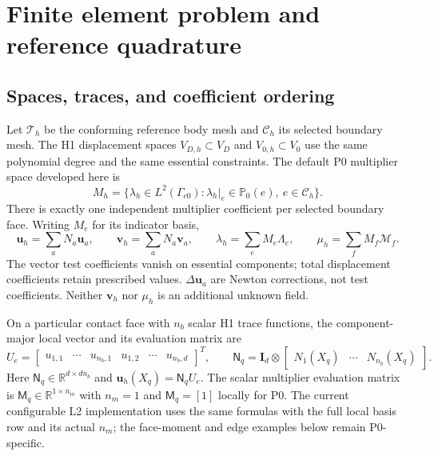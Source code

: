 \documentclass[preprint,11pt]{elsarticle}
\numberwithin{equation}{section}
\newcommand{\bu}{\boldsymbol{u}}
\newcommand{\bv}{\boldsymbol{v}}
\newcommand{\bI}{\boldsymbol{I}}
\newcommand{\Gc}{\Gamma_{c0}}
\begin{document}
\section{Finite element problem and reference quadrature}
\label{sec:discrete}

\subsection{Spaces, traces, and coefficient ordering}
Let $\mathcal{T}_h$ be the conforming reference body mesh and
$\mathcal{C}_h$ its selected boundary mesh. The H1 displacement spaces
$V_{D,h}\subset V_D$ and $V_{0,h}\subset V_0$ use the same polynomial
degree and the same essential constraints. The default P0 multiplier
space developed here is
\begin{equation}
 M_h=\{\lambda_h\in L^2(\Gc):
             \lambda_h|_e\in\mathbb{P}_0(e),\ e\in\mathcal{C}_h\}.
 \label{eq:p0space}
\end{equation}
There is exactly one independent multiplier coefficient per selected
boundary face. Writing $M_e$ for its indicator basis,
\begin{equation}
 \bu_h=\sum_a N_a\boldsymbol{u}_a,\qquad
 \bv_h=\sum_a N_a\boldsymbol{v}_a,\qquad
 \lambda_h=\sum_e M_e\Lambda_e,\qquad
 \mu_h=\sum_f M_f\mathcal{M}_f.
 \label{eq:febases}
\end{equation}
The vector test coefficients vanish on essential components; total
displacement coefficients retain prescribed values. $\Delta\boldsymbol{u}_a$
are Newton corrections, not test coefficients. Neither $\bv_h$ nor
$\mu_h$ is an additional unknown field.

On a particular contact face with $n_b$ scalar H1 trace functions, the
component-major local vector and its evaluation matrix are
\begin{equation}
 U_e=\begin{bmatrix}
 u_{1,1}&\cdots&u_{n_b,1}&u_{1,2}&\cdots&u_{n_b,d}
 \end{bmatrix}^{T},\qquad
 \mathsf N_q=\bI_d\otimes
      \begin{bmatrix}N_1(X_q)&\cdots&N_{n_b}(X_q)\end{bmatrix}.
 \label{eq:evalmatrix}
\end{equation}
Here $\mathsf N_q\in\mathbb{R}^{d\times dn_b}$ and
$\bu_h(X_q)=\mathsf N_qU_e$. The scalar multiplier evaluation matrix
is $\mathsf M_q\in\mathbb{R}^{1\times n_m}$ with $n_m=1$ and
$\mathsf M_q=[1]$ locally for P0. The current configurable L2 implementation
uses the same formulas with the full local basis row and its actual $n_m$;
the face-moment and edge examples below remain P0-specific.
\end{document}
